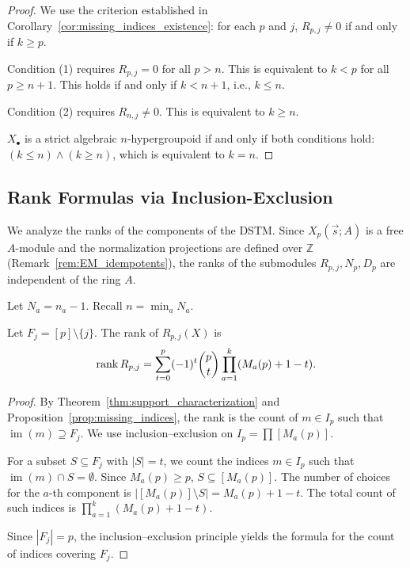 \begin{proof}
We use the criterion established in Corollary~\ref{cor:missing_indices_existence}: for each $p$ and $j$, $R_{p,j} \ne 0$ if and only if $k \ge p$.


Condition (1) requires $R_{p,j}=0$ for all $p>n$. This is equivalent to $k < p$ for all $p \ge n+1$. This holds if and only if $k < n+1$, i.e., $k \le n$.

Condition (2) requires $R_{n,j}\ne 0$. This is equivalent to $k \ge n$.

$X_\bullet$ is a strict algebraic $n$-hypergroupoid if and only if both conditions hold: $(k \le n) \land (k \ge n)$, which is equivalent to $k=n$.
\end{proof}

\subsection{Rank Formulas via Inclusion-Exclusion}

We analyze the ranks of the components of the DSTM. Since $X_p(\vec{s};A)$ is a free $A$-module and the normalization projections are defined over $\mathbb{Z}$ (Remark~\ref{rem:EM_idempotents}), the ranks of the submodules $R_{p,j}, N_p, D_p$ are independent of the ring $A$.

Let $N_a=n_a-1$. Recall $n=\min_a N_a$.

\begin{proposition}[Rank of $R_{p,j}$]\label{prop:rank-IE}
Let $F_j=[p]\setminus\{j\}$. The rank of $R_{p,j}(X)$ is
\[
\operatorname{rank} R_{p,j}
=\sum_{t=0}^{p}(-1)^t\binom{p}{t}\prod_{a=1}^k(M_a(p)+1-t).
\]
\end{proposition}

\begin{proof}
By Theorem~\ref{thm:support_characterization} and Proposition~\ref{prop:missing_indices}, the rank is the count of $m\in I_p$ such that $\operatorname{im}(m)\supseteq F_j$. We use inclusion--exclusion on $I_p = \prod [M_a(p)]$.

For a subset $S\subseteq F_j$ with $|S|=t$, we count the indices $m\in I_p$ such that $\operatorname{im}(m) \cap S = \emptyset$. Since $M_a(p) \ge p$, $S \subseteq [M_a(p)]$. The number of choices for the $a$-th component is $|[M_a(p)] \setminus S| = M_a(p)+1-t$. The total count of such indices is $\prod_{a=1}^k (M_a(p)+1-t)$.

Since $|F_j|=p$, the inclusion--exclusion principle yields the formula for the count of indices covering $F_j$.
\end{proof}

